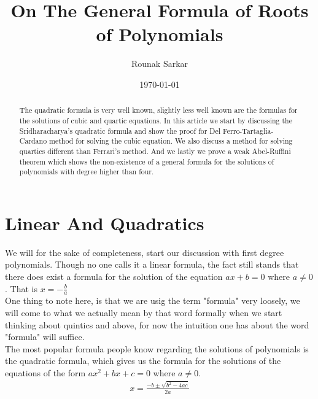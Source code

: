\documentclass[a4paper,12pt,abstracton]{scrartcl}
\theoremstyle{dotlessP}
\theoremstyle{dotlessS}
\theoremstyle{remark}
\theoremstyle{definition}
\begin{document}

\title{On The General Formula of Roots of Polynomials}
\subtitle{}
\author{Rounak Sarkar}
\date{\today}
\maketitle

\begin{abstract}
The quadratic formula is very well known, slightly less well known are the formulas for the solutions of cubic and quartic equations. In this article we start by discussing the Sridharacharya's quadratic formula and show the proof for Del Ferro-Tartaglia-Cardano method for solving the cubic equation. We also discuss a method for solving quartics different than Ferrari's method. And we lastly we prove a weak Abel-Ruffini theorem which shows the non-existence of a general formula for the solutions of polynomials with degree higher than four. 
\end{abstract}

\tableofcontents

\eject



\section{Linear And Quadratics}

We will for the sake of completeness, start our discussion with first degree polynomials. Though no one calls it a linear formula, the fact still stands that there does exist a formula for the solution of the equation $ax+b=0$ where $a\neq 0$. That is $x=-\frac{b}{a}$\\

One thing to note here, is that we are usig the term "formula" very loosely, we will come to what we actually mean by that word formally when we start thinking about quintics and above, for now the intuition one has about the word "formula" will suffice.\\

The most popular formula people know regarding the solutions of polynomials is the quadratic formula, which gives us the formula for the solutions of the equations of the form $ax^2+bx+c=0$ where $a\neq 0$.\\
\begin{align*}
x=\frac{-b\pm\sqrt{b^2-4ac}}{2a}
\end{align*}
\end{document}
